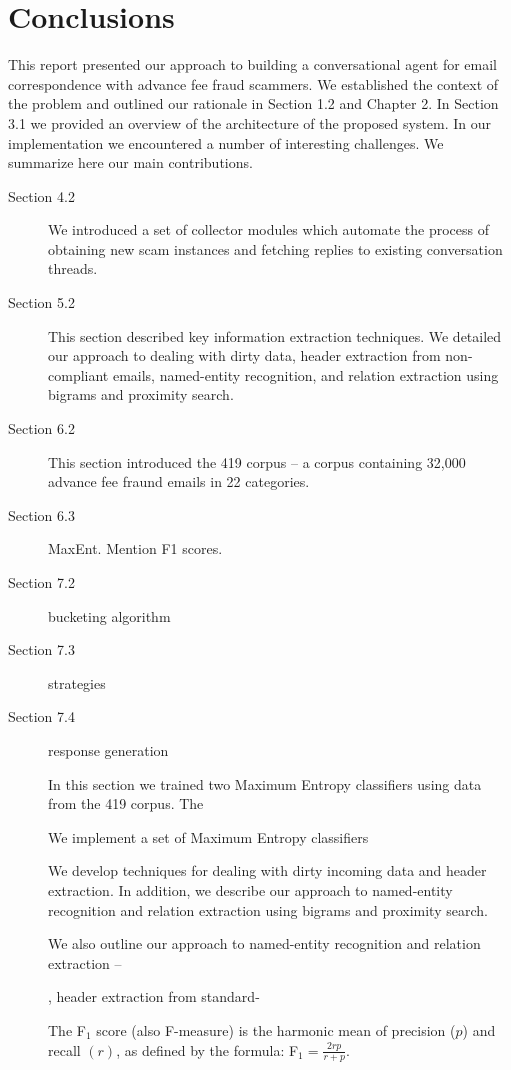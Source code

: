 \chapter{Conclusions}
This report presented our approach to building a conversational agent for email correspondence with advance fee fraud scammers.
We established the context of the problem and outlined our rationale in Section 1.2 and Chapter 2. In Section 3.1 we provided an
overview of the architecture of the proposed system. In our implementation we encountered a number of interesting challenges.
We summarize here our main contributions.
\begin{description}
\item[Section 4.2] We introduced a set of collector modules which automate the process of obtaining new scam instances and fetching replies to existing conversation threads.
\item[Section 5.2] This section described key information extraction techniques. We detailed our approach to dealing with dirty data, header extraction from non-compliant emails, named-entity recognition, and relation extraction using bigrams and proximity search.
\item[Section 6.2] This section introduced the 419 corpus -- a corpus containing 32,000 advance fee fraund emails in 22 categories.
\item[Section 6.3] MaxEnt. Mention F1 scores.
\item[Section 7.2] bucketing algorithm
\item[Section 7.3] strategies
\item[Section 7.4] response generation

In this section we trained two Maximum Entropy classifiers using data from the 419 corpus. The 

We implement a set of Maximum Entropy classifiers 

We develop techniques for dealing with dirty incoming data and header extraction. In addition, we describe our approach to named-entity recognition and relation extraction using bigrams and proximity search.


We also outline our approach to named-entity recognition and relation extraction -- 

, header extraction from standard-


The F$_{1}$ score (also F-measure) is the harmonic mean of precision ($p$) and recall $(r)$, as defined by the formula: F$_{1} = \frac{2rp}{r + p}$.
\end{description}	


